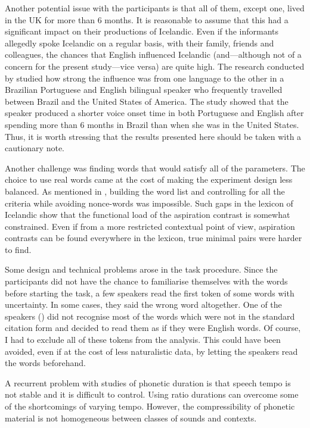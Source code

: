 \documentclass[11pt,a4paper,openany]{memoir}\usepackage[]{graphicx}\usepackage[]{color}
\begin{document}
Another potential issue with the participants is that all of them, except one, lived in the UK for more than 6 months.
It is reasonable to assume that this had a significant impact on their productions of Icelandic.
Even if the informants allegedly spoke Icelandic on a regular basis, with their family, friends and colleagues, the chances that English influenced Icelandic (and---although not of a concern for the present study---vice versa) are quite high.
The research conducted by \citet{sancier1997} studied how strong the influence was from one language to the other in a Brazilian Portuguese and English bilingual speaker who frequently travelled between Brazil and the United States of America.
The study showed that the speaker produced a shorter voice onset time in both Portuguese and English after spending more than 6 months in Brazil than when she was in the United States.
Thus, it is worth stressing that the results presented here should be taken with a cautionary note.

Another challenge was finding words that would satisfy all of the parameters.
The choice to use real words came at the cost of making the experiment design less balanced.
As mentioned in , building the word list and controlling for all the criteria while avoiding nonce-words was impossible.
Such gaps in the lexicon of Icelandic show that the functional load of the aspiration contrast is somewhat constrained.
Even if from a more restricted contextual point of view, aspiration contrasts can be found everywhere in the lexicon, true minimal pairs were harder to find.

Some design and technical problems arose in the task procedure.
Since the participants did not have the chance to familiarise themselves with the words before starting the task, a few speakers read the first token of some words with uncertainty.
In some cases, they said the wrong word altogether.
One of the speakers () did not recognise most of the words which were not in the standard citation form and decided to read them as if they were English words.
Of course, I had to exclude all of these tokens from the analysis.
This could have been avoided, even if at the cost of less naturalistic data, by letting the speakers read the words beforehand.

A recurrent problem with studies of phonetic duration is that speech tempo is not stable and it is difficult to control.
Using ratio durations can overcome some of the shortcomings of varying tempo.
However, the compressibility of phonetic material is not homogeneous between classes of sounds and contexts.
\end{document}
